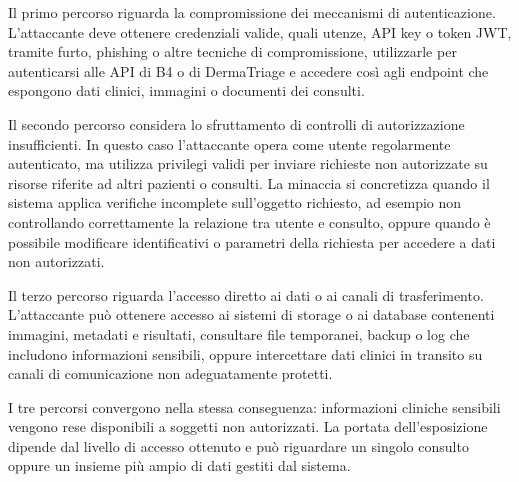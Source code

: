 Il primo percorso riguarda la compromissione dei meccanismi di autenticazione. L'attaccante deve ottenere credenziali valide, quali utenze, API key o token JWT, tramite furto, phishing o altre tecniche di compromissione, utilizzarle per autenticarsi alle API di B4 o di DermaTriage e accedere così agli endpoint che espongono dati clinici, immagini o documenti dei consulti.

Il secondo percorso considera lo sfruttamento di controlli di autorizzazione insufficienti. In questo caso l'attaccante opera come utente regolarmente autenticato, ma utilizza privilegi validi per inviare richieste non autorizzate su risorse riferite ad altri pazienti o consulti. La minaccia si concretizza quando il sistema applica verifiche incomplete sull'oggetto richiesto, ad esempio non controllando correttamente la relazione tra utente e consulto, oppure quando è possibile modificare identificativi o parametri della richiesta per accedere a dati non autorizzati.

Il terzo percorso riguarda l'accesso diretto ai dati o ai canali di trasferimento. L'attaccante può ottenere accesso ai sistemi di storage o ai database contenenti immagini, metadati e risultati, consultare file temporanei, backup o log che includono informazioni sensibili, oppure intercettare dati
clinici in transito su canali di comunicazione non adeguatamente protetti.

I tre percorsi convergono nella stessa conseguenza: informazioni cliniche sensibili vengono rese disponibili a soggetti non autorizzati. La portata dell'esposizione dipende dal livello di accesso ottenuto e può riguardare un singolo consulto oppure un insieme più ampio di dati gestiti dal sistema.